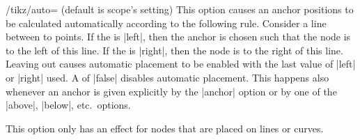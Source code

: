 \begin{key}{/tikz/auto= (default \normalfont is scope's setting)}
  This option causes an anchor positions to be calculated
  automatically according to the following rule. Consider a line
  between to points. If the  is |left|, then the
  anchor is chosen such that the node is to the left of this line. If
  the  is |right|, then the node is to the right of
  this line. Leaving out  causes automatic placement
  to be enabled with the last value of |left| or |right| used. A
   of |false| disables automatic placement. This
  happens also  whenever an anchor is given explicitly by the
  |anchor| option or by one of the |above|, |below|, etc.\ options.

  This option only has an effect for nodes that are placed on lines or
  curves.

\begin{codeexample}[]
\end{codeexample}
\end{key}

